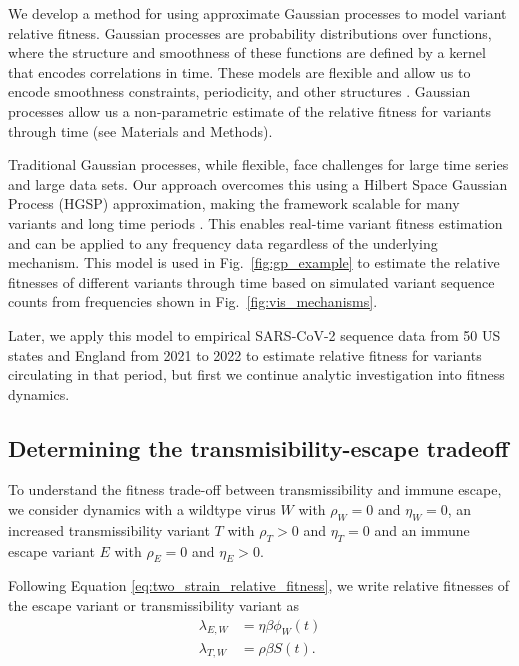 \documentclass[11pt,oneside,letterpaper]{article}
\newcommand{\wt}{W}
\newcommand{\varE}{E}
\newcommand{\varT}{T}
\newcommand{\varEscape}{\eta}
\newcommand{\varTransmission}{\rho}
\begin{document}
We develop a method for using approximate Gaussian processes to model variant relative fitness.
Gaussian processes are probability distributions over functions, where the structure and smoothness of these functions are defined by a kernel that encodes correlations in time.
These models are flexible and allow us to encode smoothness constraints, periodicity, and other structures \cite{Gortler2019a}.
Gaussian processes allow us a non-parametric estimate of the relative fitness for variants through time (see Materials and Methods).

Traditional Gaussian processes, while flexible, face challenges for large time series and large data sets.
Our approach overcomes this using a Hilbert Space Gaussian Process (HGSP) approximation, making the framework scalable for many variants and long time periods \cite{riutortmayol2022practical}.
This enables real-time variant fitness estimation and can be applied to any frequency data regardless of the underlying mechanism.
This model is used in Fig.~\ref{fig:gp_example} to estimate the relative fitnesses of different variants through time based on simulated variant sequence counts from frequencies shown in Fig.~\ref{fig:vis_mechanisms}.

Later, we apply this model to empirical SARS-CoV-2 sequence data from 50 US states and England from 2021 to 2022 to estimate relative fitness for variants circulating in that period, but first we continue analytic investigation into fitness dynamics.

\subsection*{Determining the transmisibility-escape tradeoff}

To understand the fitness trade-off between transmissibility and immune escape, we consider dynamics with a wildtype virus $\wt$ with $\varTransmission_\wt = 0$ and $\varEscape_\wt = 0$, an increased transmissibility variant $\varT$ with $\varTransmission_\varT > 0$ and $\varEscape_\varT = 0$ and an immune escape variant $\varE$ with $\varTransmission_\varE = 0$ and $\varEscape_\varE > 0$.

Following Equation \ref{eq:two_strain_relative_fitness}, we write relative fitnesses of the escape variant or transmissibility variant as
\begin{align}
    \lambda_{\varE, \wt} &= \varEscape \beta \phi_{\wt}(t)\\
    \lambda_{\varT, \wt} &= \varTransmission \beta S(t).
\end{align}
\end{document}
